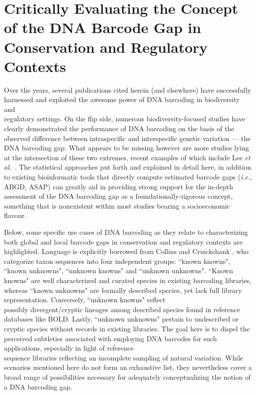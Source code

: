 \section{Critically Evaluating the Concept of the DNA Barcode Gap in Conservation and Regulatory Contexts}

Over the years, several publications cited herein (and elsewhere) have successfully \\ harnessed and exploited the awesome power of DNA barcoding in biodiversity and \\ regulatory settings. On the flip side, numerous biodiversity-focused studies have clearly demonstrated the performance of DNA barcoding on the basis of the observed difference between intraspecific and interspecific genetic variation --- the DNA barcoding gap. What appears to be missing however are more studies lying at the intersection of these two extremes, recent examples of which include Lee \textit{et al.}~\cite{lee2019towards}. The statistical approaches put forth and explained in detail here, in addition to existing bioinformatic tools that directly compute estimated barcode gaps (\textit{i.e.}, ABGD, ASAP) can greatly aid in providing strong support for the in-depth assessment of the DNA barcoding gap as a foundationally-rigorous concept, something that is nonexistent within most studies bearing a socioeconomic flavour.



Below, some specific use cases of DNA barcoding as they relate to characterizing both global and local barcode gaps in conservation and regulatory contexts are highlighted. Language is explicitly borrowed from Collins and Cruickshank \cite{collins2014known}, who categorize taxon sequences into four independent groups: ``known knowns", ``known unknowns", ``unknown knowns" and ``unknown unknowns". ``Known knowns" are well characterized and curated species in existing barcoding libraries, whereas ``known unknowns" are formally described species, yet lack full library representation. Conversely, ``unknown knowns" reflect \\ possibly divergent/cryptic lineages among described species found in reference databases like BOLD. Lastly, ``unknown unknowns" pertain to undescribed or cryptic species without records in existing libraries. The goal here is to dispel the perceived subtleties associated with employing DNA barcodes for such applications, especially in light of reference  \\ sequence libraries reflecting an incomplete sampling of natural variation. While scenarios mentioned here do not form an exhaustive list, they nevertheless cover a broad range of possibilities necessary for adequately conceptualizing the notion of a DNA barcoding gap.



